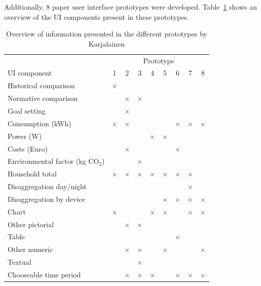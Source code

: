 \documentclass[journal]{vgtc}                %
\begin{document}
Additionally, 8 paper user interface prototypes were developed. Table~\ref{prototypes} shows an overview of the UI components present in these prototypes.

\begin{table}
  \caption{Overview of information presented in the different prototypes by Karjalainen\cite{karjalainen2011consumer}}
  \label{prototypes}
  \scriptsize
  \begin{center}
    \begin{tabular}{|l|cccccccc|}
    \hline
      & \multicolumn{8}{|c|}{Prototype} \\
    
      UI component & 1 & 2 & 3 & 4 & 5 & 6 & 7 & 8 \\
    \hline
      Historical comparison & $\times$ &  &  &  &  &  &  & \\ \hline
      Normative comparison &  & $\times$ & $\times$ &  &  &  &  & \\ \hline
      Goal setting &  & $\times$ &  &  &  &  &  & \\ \hline
      Consumption (kWh) & $\times$ & $\times$ &  &  &  & $\times$ & $\times$ & $\times$ \\ \hline
      Power (W) &  &  &  & $\times$ & $\times$ &  &  & \\ \hline
      Costs (Euro) &  & $\times$ &  &  &  & $\times$ &  & \\ \hline
      Environmental factor (kg CO$_2$) &  &  & $\times$ &  &  &  &  & \\ \hline
      Household total & $\times$ & $\times$ & $\times$ & $\times$ & $\times$ & $\times$ & $\times$ & \\ \hline
      Disaggregation day/night &  &  &  &  &  &  & $\times$ & \\ \hline
      Disaggregation by device &  &  &  &  & $\times$ & $\times$ & $\times$ & $\times$ \\ \hline
      Chart & $\times$ &  &  & $\times$ & $\times$ &  & $\times$ & $\times$ \\ \hline
      Other pictorial &  & $\times$ & $\times$ &  &  &  &  & \\ \hline
      Table &  &  &  &  &  & $\times$ &  & \\ \hline
      Other numeric &  & $\times$ & $\times$ &  & $\times$ &  &  & $\times$ \\ \hline
      Textual &  &  & $\times$ &  &  &  &  & \\ \hline
      Chooseable time period &  & $\times$ & $\times$ & $\times$ &  & $\times$ & $\times$ &  $\times$ \\ \hline
    \end{tabular}
  \end{center}
\end{table}
\end{document}

